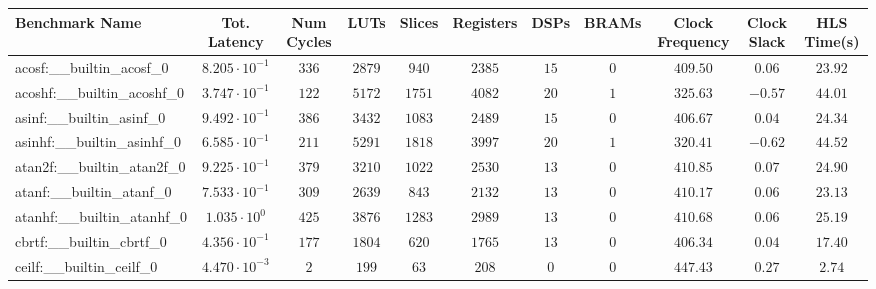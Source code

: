 \begin{tabular}{|l|c|c|c|c|c|c|c|c|c|c|}
\hline
Benchmark Name                            & Tot. Latency            & Num Cycles & LUTs      & Slices    & Registers & DSPs    & BRAMs & Clock Frequency & Clock Slack & HLS Time(s) \\
\hline
acosf:\_\_builtin\_acosf\_0               & $ 8.205 \cdot 10^{-1} $ & $ 336    $ & $ 2879  $ & $ 940   $ & $ 2385  $ & $ 15  $ & $ 0 $ & $ 409.50      $ & $ 0.06    $ & $ 23.92   $ \\
acoshf:\_\_builtin\_acoshf\_0             & $ 3.747 \cdot 10^{-1} $ & $ 122    $ & $ 5172  $ & $ 1751  $ & $ 4082  $ & $ 20  $ & $ 1 $ & $ 325.63      $ & $ -0.57   $ & $ 44.01   $ \\
asinf:\_\_builtin\_asinf\_0               & $ 9.492 \cdot 10^{-1} $ & $ 386    $ & $ 3432  $ & $ 1083  $ & $ 2489  $ & $ 15  $ & $ 0 $ & $ 406.67      $ & $ 0.04    $ & $ 24.34   $ \\
asinhf:\_\_builtin\_asinhf\_0             & $ 6.585 \cdot 10^{-1} $ & $ 211    $ & $ 5291  $ & $ 1818  $ & $ 3997  $ & $ 20  $ & $ 1 $ & $ 320.41      $ & $ -0.62   $ & $ 44.52   $ \\
atan2f:\_\_builtin\_atan2f\_0             & $ 9.225 \cdot 10^{-1} $ & $ 379    $ & $ 3210  $ & $ 1022  $ & $ 2530  $ & $ 13  $ & $ 0 $ & $ 410.85      $ & $ 0.07    $ & $ 24.90   $ \\
atanf:\_\_builtin\_atanf\_0               & $ 7.533 \cdot 10^{-1} $ & $ 309    $ & $ 2639  $ & $ 843   $ & $ 2132  $ & $ 13  $ & $ 0 $ & $ 410.17      $ & $ 0.06    $ & $ 23.13   $ \\
atanhf:\_\_builtin\_atanhf\_0             & $ 1.035 \cdot 10^{0}  $ & $ 425    $ & $ 3876  $ & $ 1283  $ & $ 2989  $ & $ 13  $ & $ 0 $ & $ 410.68      $ & $ 0.06    $ & $ 25.19   $ \\
cbrtf:\_\_builtin\_cbrtf\_0               & $ 4.356 \cdot 10^{-1} $ & $ 177    $ & $ 1804  $ & $ 620   $ & $ 1765  $ & $ 13  $ & $ 0 $ & $ 406.34      $ & $ 0.04    $ & $ 17.40   $ \\
ceilf:\_\_builtin\_ceilf\_0               & $ 4.470 \cdot 10^{-3} $ & $ 2      $ & $ 199   $ & $ 63    $ & $ 208   $ & $ 0   $ & $ 0 $ & $ 447.43      $ & $ 0.27    $ & $ 2.74    $ \\

\end{tabular}
